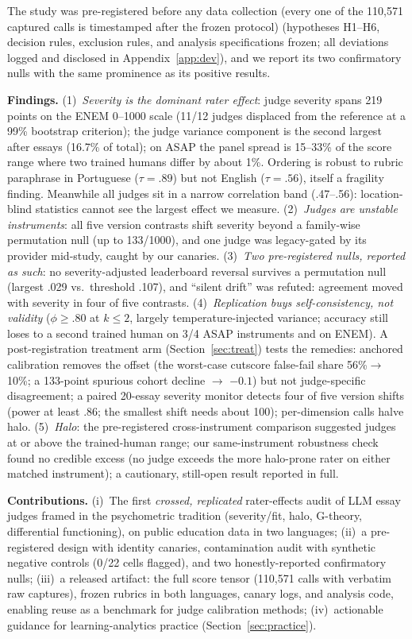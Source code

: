 \documentclass[fleqn,10pt]{JLA_article}
\begin{document}
The study was pre-registered before any data collection (every one of the 110{,}571 captured calls is timestamped after the frozen protocol) (hypotheses H1--H6, decision rules,
exclusion rules, and analysis specifications frozen; all deviations logged and disclosed in
Appendix~\ref{app:dev}), and we report its two confirmatory nulls with the same prominence as its
positive results.


\textbf{Findings.} (1)~\emph{Severity is the dominant rater effect}: judge severity spans 219 points on the ENEM 0--1000 scale (11/12 judges displaced from the reference at a 99\% bootstrap criterion); the judge variance component is the second largest after essays (16.7\% of total); on ASAP the panel spread is 15--33\% of the score range where two trained humans differ by about 1\%. Ordering is robust to rubric paraphrase in Portuguese ($\tau{=}.89$) but not English ($\tau{=}.56$), itself a fragility finding. Meanwhile all judges sit in a narrow correlation band (.47--.56): location-blind statistics cannot see the largest effect we measure. (2)~\emph{Judges are unstable instruments}: all five version contrasts shift severity beyond a family-wise permutation null (up to 133/1000), and one judge was legacy-gated by its provider mid-study, caught by our canaries. (3)~\emph{Two pre-registered nulls, reported as such}: no severity-adjusted leaderboard reversal survives a permutation null (largest .029 vs.\ threshold .107), and ``silent drift'' was refuted: agreement moved with severity in four of five contrasts. (4)~\emph{Replication buys self-consistency, not validity} ($\phi{\geq}.80$ at $k{\leq}2$, largely temperature-injected variance; accuracy still loses to a second trained human on 3/4 ASAP instruments and on ENEM). A post-registration treatment arm (Section~\ref{sec:treat}) tests the remedies: anchored calibration removes the offset (the worst-case cutscore false-fail share 56\%$\to$10\%; a 133-point spurious cohort decline $\to$ $-0.1$) but not judge-specific disagreement; a paired 20-essay severity monitor detects four of five version shifts (power at least .86; the smallest shift needs about 100); per-dimension calls halve halo. (5)~\emph{Halo}: the pre-registered cross-instrument comparison suggested judges at or above the trained-human range; our same-instrument robustness check found no credible excess (no judge exceeds the more halo-prone rater on either matched instrument); a cautionary, still-open result reported in full.

\textbf{Contributions.} (i)~The first \emph{crossed, replicated} rater-effects audit of LLM essay
judges framed in the psychometric tradition (severity/fit, halo, G-theory, differential
functioning), on public education data in two languages; (ii)~a pre-registered design with
identity canaries, contamination audit with synthetic negative controls (0/22 cells flagged), and
two honestly-reported confirmatory nulls; (iii)~a released artifact: the full score tensor
(110,571 calls with verbatim raw captures), frozen rubrics in both languages, canary logs, and
analysis code, enabling reuse as a benchmark for judge calibration methods; (iv)~actionable
guidance for learning-analytics practice (Section~\ref{sec:practice}).
\end{document}
